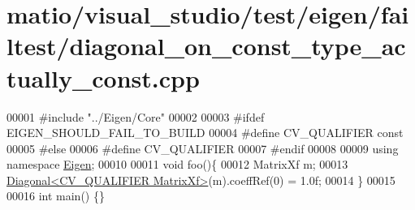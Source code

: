 \hypertarget{matio_2visual__studio_2test_2eigen_2failtest_2diagonal__on__const__type__actually__const_8cpp_source}{}\section{matio/visual\+\_\+studio/test/eigen/failtest/diagonal\+\_\+on\+\_\+const\+\_\+type\+\_\+actually\+\_\+const.cpp}
\label{matio_2visual__studio_2test_2eigen_2failtest_2diagonal__on__const__type__actually__const_8cpp_source}

\begin{DoxyCode}
00001 \textcolor{preprocessor}{#include "../Eigen/Core"}
00002 
00003 \textcolor{preprocessor}{#ifdef EIGEN\_SHOULD\_FAIL\_TO\_BUILD}
00004 \textcolor{preprocessor}{#define CV\_QUALIFIER const}
00005 \textcolor{preprocessor}{#else}
00006 \textcolor{preprocessor}{#define CV\_QUALIFIER}
00007 \textcolor{preprocessor}{#endif}
00008 
00009 \textcolor{keyword}{using namespace }\hyperlink{namespace_eigen}{Eigen};
00010 
00011 \textcolor{keywordtype}{void} foo()\{
00012     MatrixXf m;
00013     \hyperlink{group___core___module_class_eigen_1_1_diagonal}{Diagonal<CV\_QUALIFIER MatrixXf>}(m).coeffRef(0) = 1.0f;
00014 \}
00015 
00016 \textcolor{keywordtype}{int} main() \{\}
\end{DoxyCode}
